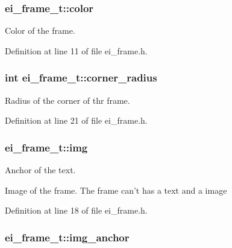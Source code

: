 \hypertarget{structei__frame__t_a421c7e34ec7903666726f2238d3225ea}{
\subsubsection[{color}]{ ei\+\_\+frame\+\_\+t\+::color}}\label{structei__frame__t_a421c7e34ec7903666726f2238d3225ea}


Color of the frame. 



Definition at line 11 of file ei\+\_\+frame.\+h.

\hypertarget{structei__frame__t_aa8e559bc95c985c05d82e0e5f9cd6768}{
\subsubsection[{corner\+\_\+radius}]{\setlength{\rightskip}{0pt plus 5cm}int ei\+\_\+frame\+\_\+t\+::corner\+\_\+radius}}\label{structei__frame__t_aa8e559bc95c985c05d82e0e5f9cd6768}


Radius of the corner of thr frame. 



Definition at line 21 of file ei\+\_\+frame.\+h.

\hypertarget{structei__frame__t_ae973c0cde8752c6d02f507930ab67654}{
\subsubsection[{img}]{ ei\+\_\+frame\+\_\+t\+::img}}\label{structei__frame__t_ae973c0cde8752c6d02f507930ab67654}


Anchor of the text. 

Image of the frame. The frame can't has a text and a image 

Definition at line 18 of file ei\+\_\+frame.\+h.

\hypertarget{structei__frame__t_a76fefc2cd628d20d2de79f96c12996a5}{
\subsubsection[{img\+\_\+anchor}]{ ei\+\_\+frame\+\_\+t\+::img\+\_\+anchor}}\label{structei__frame__t_a76fefc2cd628d20d2de79f96c12996a5}


